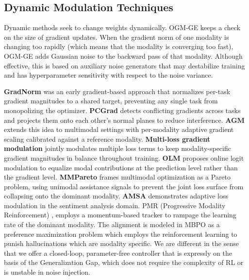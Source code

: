 \documentclass[10pt, twocolumn, letterpaper]{article}
\begin{document}
\subsection{Dynamic Modulation Techniques}
Dynamic methods seek to change weights dynamically. OGM-GE \cite{peng2022balanced} keeps a check on the size of gradient updates. When the gradient norm of one modality is changing too rapidly (which means that the modality is converging too fast), OGM-GE adds Gaussian noise to the backward pass of that modality. Although effective, this is based on auxiliary noise generators that may destabilize training and has hyperparameter sensitivity with respect to the noise variance.

\textbf{GradNorm} \cite{chen2018gradnorm} was an early gradient-based approach that normalizes per-task gradient magnitudes to a shared target, preventing any single task from monopolizing the optimizer. \textbf{PCGrad} \cite{yu2020gradient} detects conflicting gradients across tasks and projects them onto each other's normal planes to reduce interference. \textbf{AGM} \cite{li2023boosting} extends this idea to multimodal settings with per-modality adaptive gradient scaling calibrated against a reference modality. \textbf{Multi-loss gradient modulation} \cite{kontras2024improving} jointly modulates multiple loss terms to keep modality-specific gradient magnitudes in balance throughout training. \textbf{OLM} \cite{zong2024balancing} proposes online logit modulation to equalize modal contributions at the prediction level rather than the gradient level. \textbf{MMPareto} \cite{wei2024mmpareto} frames multimodal optimization as a Pareto problem, using unimodal assistance signals to prevent the joint loss surface from collapsing onto the dominant modality. \textbf{AMSA} \cite{wang2023amsa} demonstrates adaptive loss modulation in the sentiment analysis domain. PMR (Progressive Modality Reinforcement) \cite{xu2025balancebenchmark}, employs a momentum-based tracker to rampage the learning rate of the dominant modality. The alignment is modeled in MBPO \cite{liu2025modality} as a preference maximization problem which employs the reinforcement learning to punish hallucinations which are modality specific. We are different in the sense that we offer a closed-loop, parameter-free controller that is expressly on the basis of the Generalization Gap, which does not require the complexity of RL or is unstable in noise injection.
\end{document}
